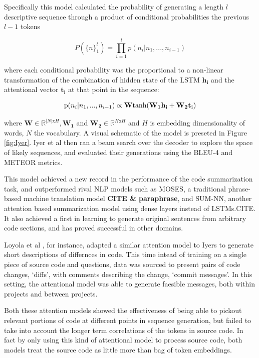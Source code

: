 Specifically this model calculated the probability of generating a length $l$
descriptive sequence through a product of conditional probabilities the previous $l-1$ tokens

$$P(\{n\}_1^l) = \prod_{i=1}^lp(n_i | n_1, ..., n_{i-1} ) $$

where each conditional probability was the proportional to a non-linear transformation of the combination of hidden state of the LSTM $\mathbf{h_i}$ and the attentional vector  $\mathbf{t_i}$ at that point in the sequence: 

$$\text p(n_i | n_1, ..., n_{i-1} ) \propto \mathbf{W}\text{tanh}(\mathbf{W_1h_i} + \mathbf{W_2t_i})$$

where $\mathbf{W} \in \mathbb{R}^{|N|\text{x} H}, \mathbf{W_1}$ and $\mathbf{W_2} \in \mathbb{R}^{H \text{x} H}$  and $ H$ is embedding dimensionality of words, $ N $ the vocabulary.\cite{iyer_summarizing_2016}
A visual schematic of the model is preseted in Figure \ref{fig:Iyer}.
Iyer et al then ran a beam search over the decoder to explore the space of likely sequences, and evaluated their generations using the BLEU-4 and METEOR metrics.

This model achieved a new record in the performance of the code summarization task, and outperformed rival NLP models such as MOSES, a traditional phrase-based machine translation model \textbf{CITE \& paraphrase}, and SUM-NN, another attention based summarization model using dense layers instead of LSTMs.CITE. It also achieved a first in learning to generate original sentences from arbitrary code sections, and has proved successful in other domains.  

Loyola et al \cite{loyola_neural_2017}, for instance, adapted a similar attention model to Iyers to generate short descriptions of differnces in code.
This time intead of training on a single piece of source code and questions, data was sourced to present pairs of code changes, `diffs', with comments describing the change, `commit messages'. 
In this setting, the attentional model was able to generate faesible messages, both within projects and between projects.

Both these attention models showed the effectiveness of being able to pickout relevant portions of code at different points in sequence generation, but failed to take into account the longer term correlations of the tokens in source code. In fact by only using this kind of attentional model to process source code, both models treat the source code as little more than bag of token embeddings.

